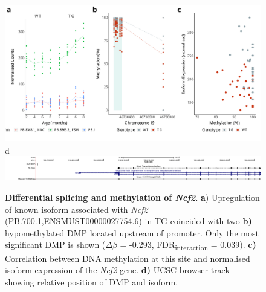 \begin{figure}[h]
	\includegraphics[page=3,scale = 0.4]{Figures/WholeDifferentialAnalysis_DMPDMR.pdf}
	\\
	\hspace*{0.2cm}\vspace{0.5cm}\large d
	\\
	\includegraphics[page=1,trim={1.5cm 0 0 0},scale = 0.9]{Figures/NCF2_DMP.pdf}
	\captionsetup{width=0.95\textwidth}
	\caption[Differential splicing and methylation of \textit{Ncf2}]%
	{\textbf{Differential splicing and methylation of \textit{Ncf2}}. \textbf{a}) Upregulation of known isoform associated with \textit{Ncf2} (PB.700.1,ENSMUST00000027754.6) in TG coincided with two \textbf{b)} hypomethylated DMP located upstream of promoter. Only the most significant DMP is shown ($\Delta$$\beta$ = -0.293, FDR\textsubscript{interaction} = 0.039). \textbf{c)} Correlation between DNA methylation at this site and normalised isoform expression of the \textit{Ncf2} gene. \textbf{d)} UCSC browser track showing relative position of DMP and isoform.}    
	\label{fig:IntMeth_Ncf2}
\end{figure}

